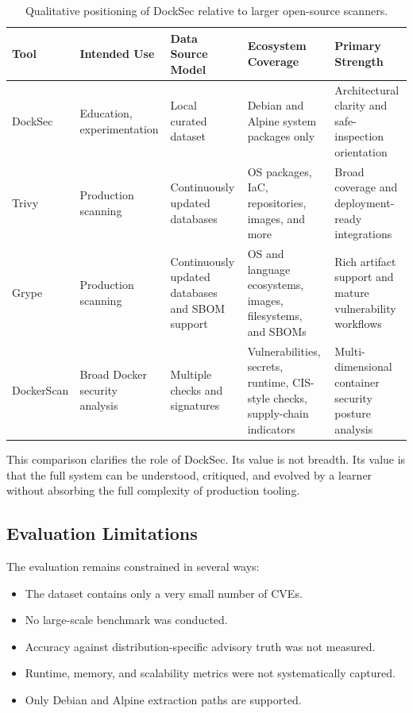 \documentclass[12pt,draftclsnofoot,onecolumn]{IEEEtran}
\begin{document}
\begin{table}[!t]
\centering
\caption{Qualitative positioning of DockSec relative to larger open-source scanners.}
\label{tab:comparison}
\begin{tabular}{p{}p{}p{}p{}p{}}
\toprule
Tool & Intended Use & Data Source Model & Ecosystem Coverage & Primary Strength \\
\midrule
DockSec & Education, experimentation & Local curated dataset & Debian and Alpine system packages only & Architectural clarity and safe-inspection orientation \\
Trivy & Production scanning & Continuously updated databases & OS packages, IaC, repositories, images, and more & Broad coverage and deployment-ready integrations \\
Grype & Production scanning & Continuously updated databases and SBOM support & OS and language ecosystems, images, filesystems, and SBOMs & Rich artifact support and mature vulnerability workflows \\
DockerScan & Broad Docker security analysis & Multiple checks and signatures & Vulnerabilities, secrets, runtime, CIS-style checks, supply-chain indicators & Multi-dimensional container security posture analysis \\
\bottomrule
\end{tabular}
\end{table}

This comparison clarifies the role of DockSec. Its value is not breadth. Its value is that the full system can be understood, critiqued, and evolved by a learner without absorbing the full complexity of production tooling.

\subsection{Evaluation Limitations}
The evaluation remains constrained in several ways:
\begin{itemize}
  \item The dataset contains only a very small number of CVEs.
  \item No large-scale benchmark was conducted.
  \item Accuracy against distribution-specific advisory truth was not measured.
  \item Runtime, memory, and scalability metrics were not systematically captured.
  \item Only Debian and Alpine extraction paths are supported.
\end{itemize}
\end{document}
